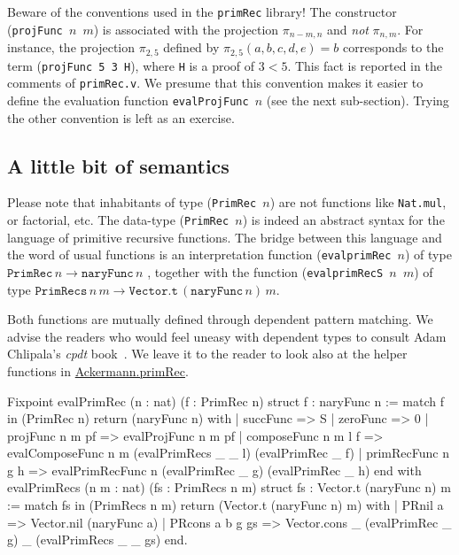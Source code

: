 \begin{remark}
\label{projFunc-order-of-args}
Beware of the conventions used in the \texttt{primRec} library!
The constructor (\texttt{projFunc $n$ $m$})  is associated with the projection $\pi_{n-m,n}$ and \emph{not}
$\pi_{n, m}$.
For instance, the projection $\pi_{2,5}$ defined by $\pi_{2,5}(a,b,c,d,e)=b$ corresponds to the term
(\texttt{projFunc 5 3 H}), where \texttt{H} is a proof of $3<5$.
 This fact is reported in the comments of \texttt{primRec.v}. We presume that this convention makes it easier to define the evaluation function \texttt{evalProjFunc $n$} (see the next sub-section). Trying the other convention is left as an exercise.
\end{remark}



\subsection{A little bit of semantics} 
Please note that inhabitants of type (\texttt{PrimRec $n$}) are not \coq{} functions like \texttt{Nat.mul}, or factorial, etc. The data-type (\texttt{PrimRec $n$}) is indeed an abstract syntax for the language of primitive recursive functions. The bridge between this language and the word of usual functions
is an interpretation function (\texttt{evalprimRec $n$})  of type
$\texttt{PrimRec}\,n \rightarrow  \texttt{naryFunc}\,n$ , together with the  function 
(\texttt{evalprimRecS $n$ $m$}) of type 
$\texttt{PrimRecs}\,n\,m \rightarrow  \texttt{Vector.t}\,(\texttt{naryFunc}\,n)\,m$.


Both functions are mutually defined through dependent pattern matching. We advise the readers who 
would feel uneasy with dependent types to consult Adam Chlipala's \emph{cpdt}  book~\cite{chlipalacpdt2011}. We leave it to the reader  to look also at the helper functions in
\href{../theories/html/hydras.Ackermann.primRec.html}{Ackermann.primRec}.


\begin{Coqsrc}
Fixpoint evalPrimRec (n : nat) (f : PrimRec n) {struct f} : 
 naryFunc n :=
  match f in (PrimRec n) return (naryFunc n) with
  | succFunc => S
  | zeroFunc => 0
  | projFunc n m pf => evalProjFunc n m pf
  | composeFunc n m l f =>
      evalComposeFunc n m (evalPrimRecs _ _ l) (evalPrimRec _ f)
  | primRecFunc n g h =>
      evalPrimRecFunc n (evalPrimRec _ g) (evalPrimRec _ h)
  end
  with evalPrimRecs (n m : nat) (fs : PrimRecs n m) {struct fs} :
 Vector.t (naryFunc n) m :=
  match fs in (PrimRecs n m) return (Vector.t (naryFunc n) m) with
  | PRnil a => Vector.nil  (naryFunc a)
  | PRcons a b g gs =>
       Vector.cons _ (evalPrimRec _ g) _  (evalPrimRecs _ _ gs)
  end.
\end{Coqsrc}

